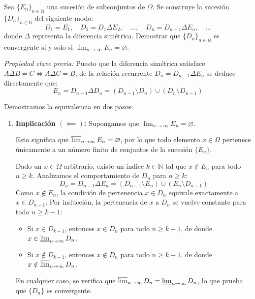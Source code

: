 \newpage
\begin{problema}
Sea $\{E_n\}_{n \in \mathbb{N}}$ una sucesión de subconjuntos de $\Omega$. Se construye la sucesión $\{D_n\}_{n \in \mathbb{N}}$ del siguiente modo:
\[
    D_1 = E_1, \quad D_2 = D_1 \Delta E_2, \quad \dots, \quad D_n = D_{n-1} \Delta E_n, \quad \dots
\]
donde $\Delta$ representa la diferencia simétrica. Demostrar que $\{D_n\}_{n \in \mathbb{N}}$ es convergente si y solo si $\displaystyle \lim_{n \to \infty} E_n = \varnothing$.

\tcblower

\textit{Propiedad clave previa:} Puesto que la diferencia simétrica satisface $A \Delta B = C \iff A \Delta C = B$, de la relación recurrente $D_n = D_{n-1} \Delta E_n$ se deduce directamente que:
\[
    E_n = D_{n-1} \Delta D_n = (D_{n-1} \setminus D_n) \cup (D_n \setminus D_{n-1})
\]

Demostramos la equivalencia en dos pasos:

\begin{enumerate}
    \item \textbf{Implicación $(\impliedby)$:} Supongamos que $\displaystyle \lim_{n \to \infty} E_n = \varnothing$.
    
    Esto significa que $\varlimsup_{n \to \infty} E_n = \varnothing$, por lo que todo elemento $x \in \Omega$ pertenece únicamente a un número finito de conjuntos de la sucesión $\{E_n\}$.
    
    Dado un $x \in \Omega$ arbitrario, existe un índice $k \in \mathbb{N}$ tal que $x \notin E_n$ para todo $n \ge k$. Analizamos el comportamiento de $D_n$ para $n \ge k$:
    \[
        D_n = D_{n-1} \Delta E_n = (D_{n-1} \setminus E_n) \cup (E_n \setminus D_{n-1})
    \]
    Como $x \notin E_n$, la condición de pertenencia $x \in D_n$ equivale exactamente a $x \in D_{n-1}$. Por inducción, la pertenencia de $x$ a $D_n$ se vuelve constante para todo $n \ge k-1$:
    \begin{itemize}
        \item Si $x \in D_{k-1}$, entonces $x \in D_n$ para todo $n \ge k-1$, de donde $x \in \varliminf_{n \to \infty} D_n$.
        \item Si $x \notin D_{k-1}$, entonces $x \notin D_n$ para todo $n \ge k-1$, de donde $x \notin \varlimsup_{n \to \infty} D_n$.
    \end{itemize}
    En cualquier caso, se verifica que $\varlimsup_{n \to \infty} D_n = \varliminf_{n \to \infty} D_n$, lo que prueba que $\{D_n\}$ es convergente.


\end{enumerate}
\end{problema}

